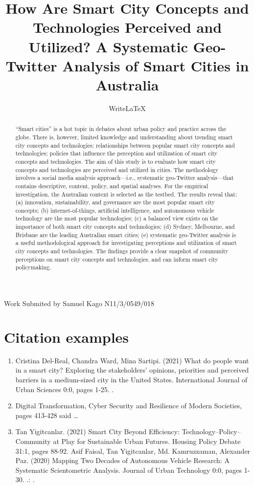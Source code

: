 \documentclass[a4paper]{article}
\title{How Are Smart City Concepts and Technologies Perceived and Utilized? A Systematic Geo-Twitter Analysis of Smart Cities in Australia}
\author{WriteLaTeX}
\date{}
\begin{document}
\maketitle
\text Work Submited by Samuel Kago N11/3/0549/018
\begin{abstract}
“Smart cities” is a hot topic in debates about urban policy and practice across the globe. There is, however, limited knowledge and understanding about trending smart city concepts and technologies; relationships between popular smart city concepts and technologies; policies that influence the perception and utilization of smart city concepts and technologies. The aim of this study is to evaluate how smart city concepts and technologies are perceived and utilized in cities. The methodology involves a social media analysis approach—i.e., systematic geo-Twitter analysis—that contains descriptive, content, policy, and spatial analyses. For the empirical investigation, the Australian context is selected as the testbed. The results reveal that: (a) innovation, sustainability, and governance are the most popular smart city concepts; (b) internet-of-things, artificial intelligence, and autonomous vehicle technology are the most popular technologies; (c) a balanced view exists on the importance of both smart city concepts and technologies; (d) Sydney, Melbourne, and Brisbane are the leading Australian smart cities; (e) systematic geo-Twitter analysis is a useful methodological approach for investigating perceptions and utilization of smart city concepts and technologies. The findings provide a clear snapshot of community perceptions on smart city concepts and technologies, and can inform smart city policymaking.
\end{abstract}

\section*{Citation examples}

\begin{enumerate}
\item 
Cristina Del-Real, Chandra Ward, Mina Sartipi. (2021) What do people want in a smart city? Exploring the stakeholders’ opinions, priorities and perceived barriers in a medium-sized city in the United States. International Journal of Urban Sciences 0:0, pages 1-25.
 \parencite{Smith:2012qr}.
\item Digital Transformation, Cyber Security and Resilience of Modern Societies, pages 413-428 \textcite{Smith:2013jd} said \dots
\item Tan Yigitcanlar. (2021) Smart City Beyond Efficiency: Technology–Policy–Community at Play for Sustainable Urban Futures. Housing Policy Debate 31:1, pages 88-92.
Asif Faisal, Tan Yigitcanlar, Md. Kamruzzaman, Alexander Paz. (2020) Mapping Two Decades of Autonomous Vehicle Research: A Systematic Scientometric Analysis. Journal of Urban Technology 0:0, pages 1-30. .: \autocite{Other:2014ab}.
\end{enumerate}

\printbibliography
\end{document}

